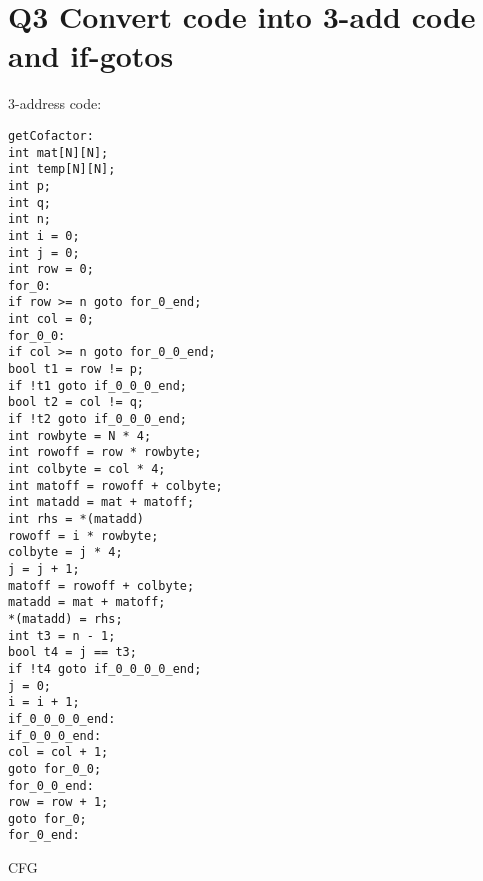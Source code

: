 \documentclass[11pt]{article}
\begin{document}
\section{Q3 Convert code into 3-add code and if-gotos}
\label{sec:org2a8ba61}
3-address code:
\begin{verbatim}
getCofactor:
int mat[N][N];
int temp[N][N];
int p;
int q;
int n;
int i = 0;
int j = 0;
int row = 0;
for_0:
if row >= n goto for_0_end;
int col = 0;
for_0_0:
if col >= n goto for_0_0_end;
bool t1 = row != p;
if !t1 goto if_0_0_0_end;
bool t2 = col != q;
if !t2 goto if_0_0_0_end;
int rowbyte = N * 4;
int rowoff = row * rowbyte;
int colbyte = col * 4;
int matoff = rowoff + colbyte;
int matadd = mat + matoff;
int rhs = *(matadd)
rowoff = i * rowbyte;
colbyte = j * 4;
j = j + 1;
matoff = rowoff + colbyte;
matadd = mat + matoff;
*(matadd) = rhs;
int t3 = n - 1;
bool t4 = j == t3;
if !t4 goto if_0_0_0_0_end;
j = 0;
i = i + 1;
if_0_0_0_0_end:
if_0_0_0_end:
col = col + 1;
goto for_0_0;
for_0_0_end:
row = row + 1;
goto for_0;
for_0_end:
\end{verbatim}

CFG
\end{document}
